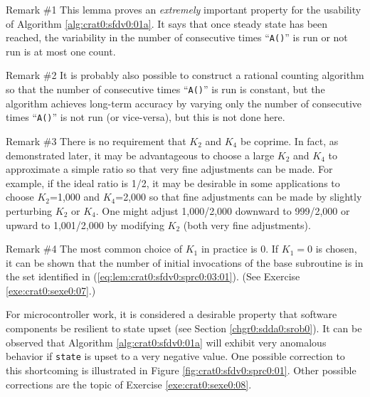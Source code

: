 \begin{vworklemmaparsection}{Remark \#1}
This lemma proves an \emph{extremely} important property for the
usability of Algorithm \ref{alg:crat0:sfdv0:01a}.  It says that once
steady state has been reached, the variability in the number of consecutive
times ``\texttt{A()}'' is run or not run is at most one count.
\end{vworklemmaparsection}
\begin{vworklemmaparsection}{Remark \#2}
It is probably also possible to construct a rational counting algorithm 
so that the number of consecutive times ``\texttt{A()}'' is run is constant,
but the algorithm achieves long-term accuracy by varying only the number
of consecutive times ``\texttt{A()}'' is not run (or vice-versa), but this
is not done here.
\end{vworklemmaparsection}
\begin{vworklemmaparsection}{Remark \#3}
There is no requirement that $K_2$ and $K_4$ be coprime.  In fact, as
demonstrated later, it may be advantageous to choose a large $K_2$ and 
$K_4$ to approximate a simple ratio so that very fine adjustments can be
made.  For example, if the ideal ratio is 1/2, it may be desirable 
in some applications to
choose $K_2$=1,000 and $K_4$=2,000 so that fine adjustments can be made
by slightly perturbing $K_2$ or $K_4$.  One might adjust 1,000/2,000 downward
to 999/2,000 or upward to 1,001/2,000 by modifying $K_2$ 
(both very fine adjustments).
\end{vworklemmaparsection}
\begin{vworklemmaparsection}{Remark \#4}
The most common choice of $K_1$ in practice is 0.  If $K_1=0$ is chosen,
it can be shown that the number of initial invocations of the
base subroutine is in the set identified in 
(\ref{eq:lem:crat0:sfdv0:sprc0:03:01}).
(See Exercise \ref{exe:crat0:sexe0:07}.)
\end{vworklemmaparsection}
\vworklemmafooter{}

For microcontroller work, it is considered
a desirable property that software components be resilient
to state upset 
(see Section \ref{chgr0:sdda0:srob0}).
It can be observed that Algorithm \ref{alg:crat0:sfdv0:01a} will
exhibit very anomalous behavior if \texttt{state} is upset to a very negative
value.  One possible correction to this shortcoming is illustrated
in Figure \ref{fig:crat0:sfdv0:sprc0:01}.  Other possible
corrections are the topic of Exercise \ref{exe:crat0:sexe0:08}.

